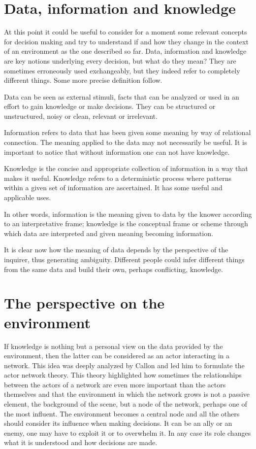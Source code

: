 \section{Data, information and knowledge}

At this point it could be useful to consider for a moment some relevant concepts for decision making and try to understand if and how they change in the context of an environment as the one described so far. Data, information and knowledge are key notions underlying every decision, but what do they mean? They are sometimes erroneously used exchangeably, but they indeed refer to completely different things. Some more precise definition follow.

Data can be seen as external stimuli, facts that can be analyzed or used in an effort to gain knowledge or make decisions. They can be structured or unstructured, noisy or clean, relevant or irrelevant.

Information refers to data that has been given some meaning by way of relational connection. The meaning applied to the data may not necessarily be useful. It is important to notice that without information one can not have knowledge.

Knowledge is the concise and appropriate collection of information in a way that makes it useful. Knowledge refers to a deterministic process where patterns within a given set of information are ascertained. It has some useful and applicable uses.

In other words, information is the meaning given to data by the knower according to an interpretative frame; knowledge is the conceptual frame or scheme through which data are interpreted and given meaning becoming information.

It is clear now how the meaning of data depends by the perspective of the inquirer, thus generating ambiguity. Different people could infer different things from the same data and build their own, perhaps conflicting, knowledge.

\section{The perspective on the environment}
If knowledge is nothing but a personal view on the data provided by the environment, then the latter can be considered as an actor interacting in a network. This idea was deeply analyzed by Callon\cite{10} and led him to formulate the actor network theory. This theory highlighted how sometimes the relationships between the actors of a network are even more important than the actors themselves and that the environment in which the network grows is not a passive element, the background of the scene, but a node of the network, perhaps one of the most influent. The environment becomes a central node and all the others should consider its influence when making decisions. It can be an ally or an enemy, one may have to exploit it or to overwhelm it. In any case its role changes what it is understood and how decisions are made.

